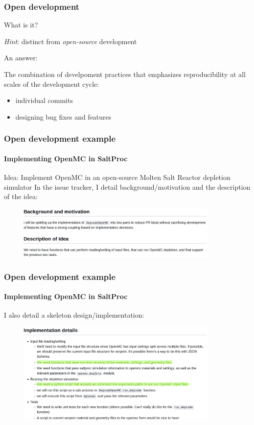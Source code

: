 \begin{frame}
  \frametitle{Open development}
  What is it?
  
  {\it Hint}: distinct from {\it open-source} development
  \pause\medskip

  An answer:

  The combination of develpoment practices that emphasizes reproducibility at all scales of the development cycle:
  \begin{itemize}
      \item individual commits
      \item designing bug fixes and features
  \end{itemize}
\end{frame}
    

\begin{frame}[fragile]
    \frametitle{Open development example}
    \framesubtitle{Implementing OpenMC in SaltProc}

    Idea: Implement OpenMC in an open-source Molten Salt Reactor depletion simulator 
    \newline
    \newline
    In the issue tracker, I detail background/motivation and the description of the idea:


    \vspace{0.5cm}
    \begin{figure}[htpb]
        \centering
        \includegraphics[width=10cm]{images/open-dev-ex1.png}
    \end{figure}

    
\end{frame}

\begin{frame}[fragile]
    \frametitle{Open development example}
    \framesubtitle{Implementing OpenMC in SaltProc}

    I also detail a skeleton design/implementation:


    \vspace{0.5cm}
    \begin{figure}[htpb]
        \centering
        \includegraphics[width=10cm]{images/open-dev-ex2.png}
    \end{figure}

\end{frame}

